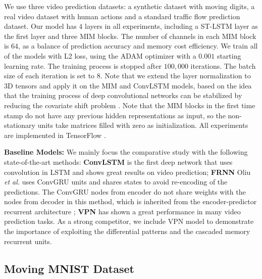 \documentclass[10pt,twocolumn,letterpaper]{article}
\begin{document}
We use three video prediction datasets: a synthetic dataset with moving digits, a real video dataset with human actions and a standard traffic flow prediction dataset. Our model has $4$ layers in all experiments, including a ST-LSTM layer as the first layer and three MIM blocks. The number of channels in each MIM block is $64$, as a balance of prediction accuracy and memory cost efficiency. We train all of the models with L2 loss, using the ADAM optimizer \citep{Kingma2014Adam} with a $0.001$ starting learning rate. The training process is stopped after $100,000$ iterations. The batch size of each iteration is set to $8$. Note that we extend the layer normalization \citep{Ba2016Layer} to 3D tensors and apply it on the MIM and ConvLSTM models, based on the idea that the training process of deep convolutional networks can be stabilized by reducing the covariate shift problem \citep{ioffe2015batch}. Note that the MIM blocks in the first time stamp do not have any previous hidden representations as input, so the non-stationary units take matrices filled with zero as initialization. All experiments are implemented in TensorFlow \citep{Abadi2016TensorFlow}.

\textbf{Baseline Models:} We mainly focus the comparative study with the following state-of-the-art methods: \textbf{ConvLSTM} \citep{shi2015convolutional} is the first deep network that uses convolution in LSTM and shows great results on video prediction;
\textbf{FRNN} Oliu \textit{et al.} \citep{oliu2017folded} uses ConvGRU units and shares states to avoid re-encoding of the predictions. The ConvGRU nodes from encoder do not share weights with the nodes from decoder in this method, which is inherited from the encoder-predictor recurrent architecture \citep{Sutskever2014Sequence,Cho2014On};
\textbf{VPN} \citep{Kalchbrenner2016Video} has shown a great performance in many video prediction tasks. As a strong competitor, we include VPN model to demonstrate the importance of exploiting the differential patterns and the cascaded memory recurrent units.

\subsection{Moving MNIST Dataset}
\end{document}
